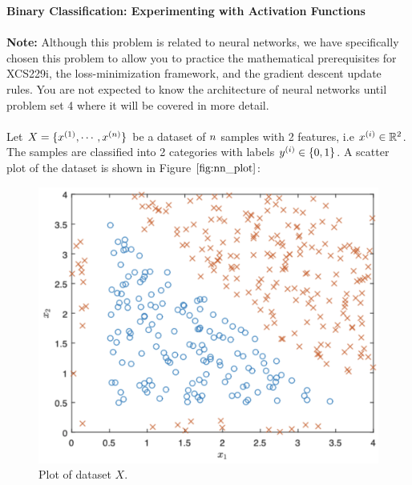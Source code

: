 \item {} {\bf Binary Classification: Experimenting with Activation Functions}\\~\\
\textbf{Note: }Although this problem is related to neural networks, we have specifically chosen this problem to allow you to practice the mathematical prerequisites for XCS229i, the loss-minimization framework, and the gradient descent update rules. You are not expected to know the architecture of neural networks until problem set 4 where it will be covered in more detail.\\~\\

Let $X = \{x^{(1)}, \cdots, x^{({n})}\}$ be a dataset of ${n}$ samples with 2 features, i.e $x^{(i)} \in \mathbb{R}^2$. The samples are classified into 2 categories with labels $y^{(i)} \in \{0, 1\}$. A scatter plot of the dataset is shown in Figure $\ref{fig:nn_plot}$:
\begin{figure}[htbp]
    \centering
    \includegraphics[scale=0.3]{simple_nn/nn_plot.png}
    \caption{Plot of dataset $X$.}
    \label{fig:nn_plot}
\end{figure}

